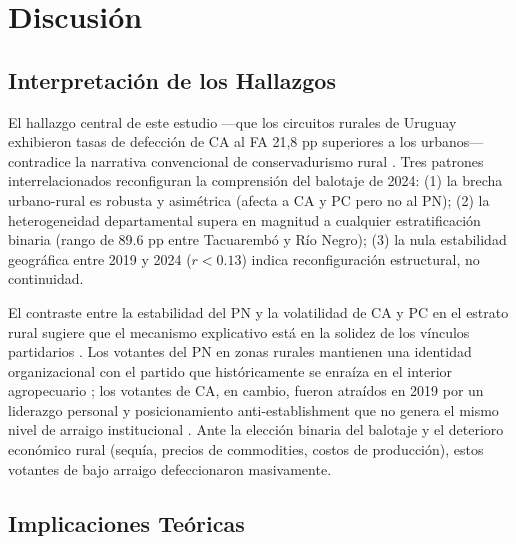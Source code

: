 
\section{Discusión}
\label{sec:discusion}

\subsection{Interpretación de los Hallazgos}

El hallazgo central de este estudio ---que los circuitos rurales de Uruguay exhibieron tasas de defección de CA al FA 21{,}8 pp superiores a los urbanos--- contradice la narrativa convencional de conservadurismo rural \citep{gonzalez1991electoral, rodden2019s}. Tres patrones interrelacionados reconfiguran la comprensión del balotaje de 2024: (1) la brecha urbano-rural es robusta y asimétrica (afecta a CA y PC pero no al PN); (2) la heterogeneidad departamental supera en magnitud a cualquier estratificación binaria (rango de 89.6 pp entre Tacuarembó y Río Negro); (3) la nula estabilidad geográfica entre 2019 y 2024 ($r < 0.13$) indica reconfiguración estructural, no continuidad.

El contraste entre la estabilidad del PN y la volatilidad de CA y PC en el estrato rural sugiere que el mecanismo explicativo está en la solidez de los vínculos partidarios \citep{buquet2015uruguayan}. Los votantes del PN en zonas rurales mantienen una identidad organizacional con el partido que históricamente se enraíza en el interior agropecuario \citep{gonzalez1993structuring}; los votantes de CA, en cambio, fueron atraídos en 2019 por un liderazgo personal y posicionamiento anti-establishment que no genera el mismo nivel de arraigo institucional \citep{perezbentancur2019frente}. Ante la elección binaria del balotaje \citep{birch2003tworound} y el deterioro económico rural (sequía, precios de commodities, costos de producción), estos votantes de bajo arraigo defeccionaron masivamente.

\subsection{Implicaciones Teóricas}


